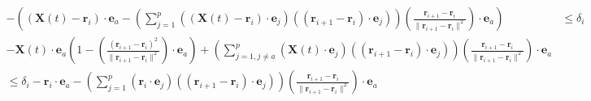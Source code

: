\documentclass[11pt]{article}
\begin{document}
\begin{align*}
- \left( (\mathbf{X}(t) - \mathbf{r}_i) \cdot \mathbf{e}_a - \left( \sum_{j = 1}^{p}  {((\mathbf{X}(t) - \mathbf{r}_i) \cdot \mathbf{e}_j)(( \mathbf{r}_{i+1} - \mathbf{r}_i ) \cdot \mathbf{e}_j)} \right) (\frac{ \mathbf{r}_{i+1} - \mathbf{r}_i } { \| \mathbf{r}_{i+1} - \mathbf{r}_i \|^2 }) \cdot \mathbf{e}_a \right) & \le \delta_i \\
- \mathbf{X}(t) \cdot \mathbf{e}_a \left( 1 - (\frac{ (\mathbf{r}_{i+1} - \mathbf{r}_i)^2 } { \| \mathbf{r}_{i+1} - \mathbf{r}_i \|^2 }) \cdot \mathbf{e}_a \right) + \left( \sum_{j = 1, j \ne a}^{p}  {(\mathbf{X}(t) \cdot \mathbf{e}_j)(( \mathbf{r}_{i+1} - \mathbf{r}_i ) \cdot \mathbf{e}_j)} \right) (\frac{ \mathbf{r}_{i+1} - \mathbf{r}_i } { \| \mathbf{r}_{i+1} - \mathbf{r}_i \|^2 }) \cdot \mathbf{e}_a &\\
 \le \delta_i - \mathbf{r}_i \cdot \mathbf{e}_a -  \left( \sum_{j = 1}^{p}  {(\mathbf{r}_i \cdot \mathbf{e}_j)(( \mathbf{r}_{i+1} - \mathbf{r}_i ) \cdot \mathbf{e}_j)} \right) (\frac{ \mathbf{r}_{i+1} - \mathbf{r}_i } { \| \mathbf{r}_{i+1} - \mathbf{r}_i \|^2 }) \cdot \mathbf{e}_a & 
\end{align*}
\end{document}
